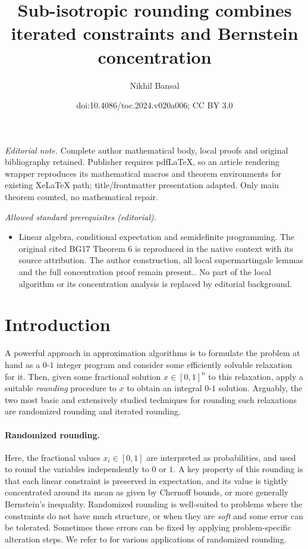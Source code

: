 \documentclass[11pt]{article}
\title{Sub-isotropic rounding combines iterated constraints and Bernstein concentration}
\author{Nikhil Bansal}
\date{doi:10.4086/toc.2024.v020a006; CC BY 3.0}
\theoremstyle{definition}
\begin{document}
\maketitle
\noindent\textit{Editorial note.} Complete author mathematical body, local proofs and original bibliography retained. Publisher requires pdfLaTeX, so an article rendering wrapper reproduces its mathematical macros and theorem environments for existing XeLaTeX path; title/frontmatter presentation adapted. Only main theorem counted, no mathematical repair.\par\medskip
\noindent\textit{Allowed standard prerequisites (editorial).}\begin{itemize}
\item Linear algebra, conditional expectation and semidefinite programming. The original cited BG17 Theorem 6 is reproduced in the native context with its source attribution. The author construction, all local supermartingale lemmas and the full concentration proof remain present.. No part of the local algorithm or its concentration analysis is replaced by editorial background.
\end{itemize}\medskip
\section{Introduction}
A powerful approach in approximation algorithms is to formulate the
problem at hand as a $0$-$1$ integer program
and consider some efficiently solvable relaxation for it. Then, given
some fractional solution $x\in [0,1]^n$ to this relaxation, apply a suitable
\emph{rounding} procedure to $x$ to obtain an integral $0$-$1$ solution.
Arguably, the two most basic and extensively studied techniques for rounding such relaxations are randomized rounding and iterated rounding.

\paragraph{Randomized rounding.} Here, the fractional values $x_i \in [0,1]$ are
interpreted as probabilities, and used to round the variables independently
to $0$ or $1$.
%
%
A key property of this rounding is that each linear constraint
is preserved in expectation, and its value is tightly  concentrated around
its mean as given by Chernoff bounds, or more generally
Bernstein's inequality.
Randomized rounding is well-suited to problems where the  constraints do not have much structure, or when they are \emph{soft} and some error can be tolerated. Sometimes these errors can be fixed by applying problem-specific alteration steps.
%
We refer to \cite{SW11, Vazirani01} for various applications of randomized rounding.
\end{document}
